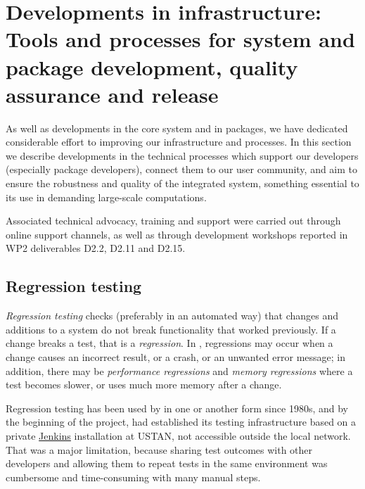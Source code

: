 \section{Developments in \GAP infrastructure: Tools and processes for
  system and package development, quality assurance and release }\label{sec:gap-infra}

As well as developments in the core system and in packages, we have
dedicated considerable effort to improving our infrastructure and processes. 
In this section we describe developments in the technical processes
which support our developers (especially package developers),
connect them to our user community, and aim to 
ensure the robustness and quality of the integrated system, something
essential to its use in demanding large-scale computations.

Associated technical advocacy, training and support
were carried out through \GAP online support channels, as well 
as through development workshops reported in WP2 deliverables D2.2,
D2.11 and D2.15.


\subsection{Regression testing}\label{testing}

\emph{Regression testing} %
checks (preferably in an automated way)
that changes and additions to a system do not break functionality that 
worked previously. If a change breaks a test, that is 
a \emph{regression}. In \GAP, regressions may occur
when a change causes an incorrect result, or a crash, or an unwanted error
message; in addition, there may be \emph{performance regressions}
and \emph{memory regressions} where a test becomes slower, or uses
much more memory after a change.

Regression testing has been used by \GAP in one or another form since 
1980s, and by the beginning of the \ODK project, \GAP had established its testing infrastructure
based on a private \href{https://jenkins.io/}{\sf Jenkins} installation
at USTAN, not accessible outside the local network. That was a major limitation,
because sharing test outcomes with other developers and
allowing them to repeat tests in the same environment was cumbersome
and time-consuming with many manual steps.

